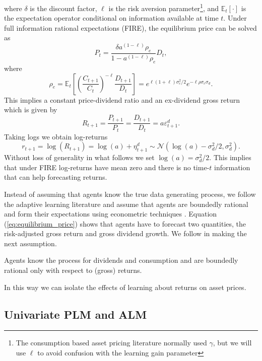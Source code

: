 where $\delta$ is the discount factor, $\ell$ is the risk aversion parameter\footnote{The consumption based asset pricing literature normally used $\gamma$, but we will use $\ell$ to avoid confusion with the learning gain parameter}, and $\mathbb{E}_t[\cdot]$ is the expectation operator conditional on information available at time $t$.
Under full information rational expectations (FIRE), the equilibrium price can be solved as
\begin{equation}
    P_t =  \frac{\delta a^{(1 - \ell)} \rho_e}{1 - a^{(1 - \ell)} \rho_e} D_t,
\end{equation}
where 
\begin{equation}
    \rho_e = \mathbb{E}_t \left[\left( \frac{C_{t+1}}{C_t}\right)^{- \ell} \frac{D_{t+1}}{D_t} \right] = e ^ {\ell(1 + \ell) \sigma^2_c/2} e ^ {-\ell \rho \sigma_c \sigma_d} .
\end{equation}
This implies a constant price-dividend ratio and an ex-dividend gross return which is given by
\begin{equation}
    R_{t+1} = \frac{P_{t+1}}{P_t} = \frac{D_{t+1}}{D_t} = a \varepsilon^d_{t+1}.
\end{equation}
Taking logs we obtain log-returns
\begin{equation}
    r_{t+1} = \log(R_{t+1}) = \log(a) + \eta^d_{t+1} \sim \mathcal{N}(\log(a) - \sigma^2_d/2, \sigma^2_d).
\end{equation}
Without loss of generality in what follows we set $\log(a) = \sigma^2_d/2$. This implies that under FIRE log-returns have mean zero and there is no time-$t$ information that can help forecasting returns.

Instead of assuming that agents know the true data generating process, we follow the adaptive learning literature and assume that agents are boundedly rational and form their expectations using econometric techniques \citep{GeorgeWEvans2001}.
Equation (\ref{eq:equilibrium_price}) shows that agents have to forecast two quantities, the risk-adjusted gross return and gross dividend growth.
We follow \cite{Adam2016} in making the next assumption.

\begin{assumption}
    Agents know the process for dividends and consumption and are boundedly rational only with respect to (gross) returns.
\end{assumption}
In this way we can isolate the effects of learning about returns on asset prices.

\subsection{Univariate PLM and ALM}

